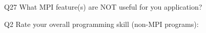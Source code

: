 \begin{description}%
\item{Q27} What MPI feature(s) are NOT useful for you application?%
\item{Q2} Rate your overall programming skill (non-MPI programs):%
\end{description}%
